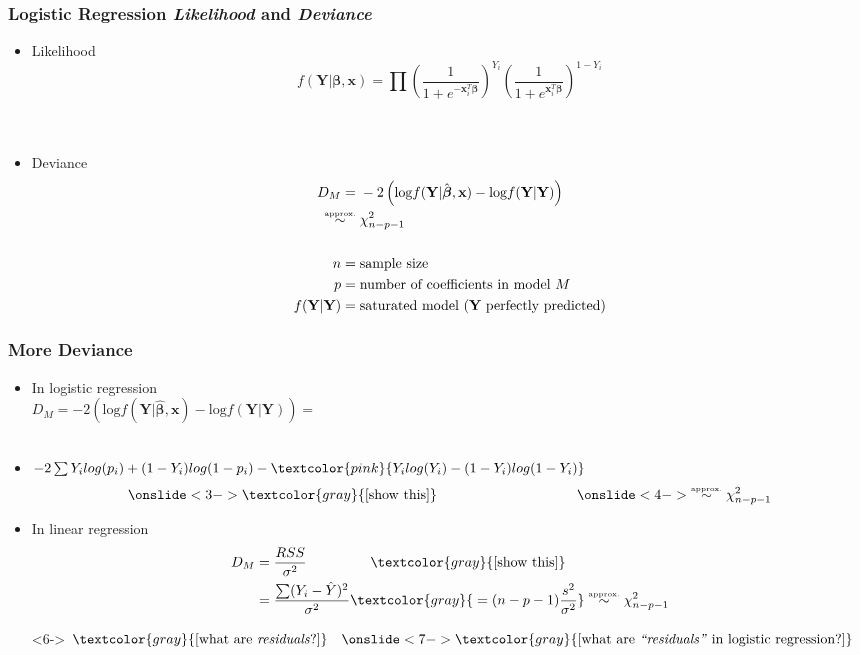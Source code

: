 \documentclass[xcolor={dvipsnames}]{beamer}
\begin{document}
\frame
{
\frametitle{Logistic Regression \emph{Likelihood} and \emph{Deviance}}

\begin{itemize}
\item Likelihood 
$$f(\textbf{Y}|{\boldsymbol \beta}, \textbf{x}) = \prod \left(\frac{1}{1+e^{-\textbf{x}_i^T \boldsymbol \beta }}\right)^{Y_i} \left(\frac{1}{1+e^{\textbf{x}_i^T\boldsymbol  \beta}}\right)^{1-Y_i} $$\\${}$
\item<2-> Deviance 
\begin{align*}
D_M ={} & -2\left( \text{log}f(\textbf{Y}|\hat {\boldsymbol \beta}, \textbf{x}) - \text{log}f(\textbf{Y}|\textbf{Y})\right) \\
\overset{\text{\tiny approx.}}{\sim} {} &  \chi^2_{n-p-1} \\ 
{}\\
n  = {} &  \text{sample size}\\
p  = {} & \text{number of coefficients in model }M\\
f(\textbf{Y}|\textbf{Y}) = {} &  \text{saturated model ($\textbf{Y}$ perfectly predicted)}
\end{align*}
\end{itemize}

}


\frame
{
\frametitle{More Deviance}

\begin{itemize}
\item In logistic regression \\
$D_M = -2\left( \text{log}f(\textbf{Y}|\hat {\boldsymbol \beta}, \textbf{x}) - \text{log}f(\textbf{Y}|\textbf{Y})\right) =$\\${}$
\item<2->[]
\hspace{-3em}$-2 \sum  Y_i log (p_i) + (1-Y_i) log (1-p_i) -  \textcolor{pink}{Y_i log (Y_i) - (1-Y_i) log (1-Y_i)}$ 
\vspace{-.5em}
$$\onslide<3->{\textcolor{gray}{\text{[show this]}}}\quad\quad\quad\quad\quad\quad\quad\quad\quad\quad\onslide<4->{\overset{\text{\tiny approx.}}{\sim} \chi^2_{n-p-1}}$$

\item<5-> In linear regression 
\begin{align*}
D_M = {}& \frac{RSS}{\sigma^2}\quad\quad\quad\quad\;\; \textcolor{gray}{\text{[show this]}} \\ %
= {}& \frac{\sum (Y_i - \hat Y)^2}{\sigma^2} \textcolor{gray}{\;=  (n-p-1) \frac{s^2}{\sigma^2}} \overset{\text{\tiny approx.}}{\sim} \chi^2_{n-p-1}
\end{align*}

\item[]<6-> 
\hspace{-1em}$\textcolor{gray}{[\text{what are \emph{residuals}?}]} \quad \onslide<7->{\textcolor{gray}{[\text{what are \emph{``residuals''} in logistic regression?}]}}$

\end{itemize}
}
\end{document}
